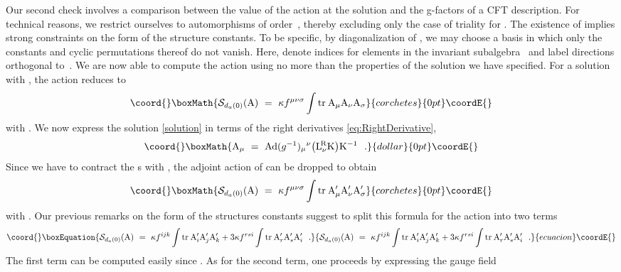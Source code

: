 \documentclass[12pt,a4paper]{article}
\providecommand{\tr}{\text{tr}}
\providecommand{\mf}{\mathfrak} %
\def\ig{\mf{g}^\omega} %
\def\tT{{\rm T}} %
\def\tR{{\rm R}} %
\def\tK{{\rm K}} %
\def\cS{{\mathcal S}}
\def\tF{{\rm F}}
\def\tA{{\rm A}}
\def\tL{{\rm L}}
\def\Ad{{\rm Ad}}
\begin{document}
Our second check involves a comparison between the value of the action 
at the solution and the g-factors of a CFT description. For technical 
reasons, we restrict ourselves to automorphisms \myHighlight{$\omega$}\coordHE{} of order~\coordHE{}, 
thereby excluding only the case of triality for \coordHE{}. The existence of
\myHighlight{$\omega$}\coordHE{} 
implies strong constraints on the form of the structure constants. To 
be specific, by diagonalization of \myHighlight{$\omega$}\coordHE{}, we may choose a basis 
in which only the constants \coordHE{} and cyclic permutations 
thereof do not vanish. Here, \coordHE{} denote indices for elements 
in the invariant subalgebra~\myHighlight{$\ig$}\coordHE{} and \coordHE{} label directions 
orthogonal to~\myHighlight{$\ig$}\coordHE{}. We are now able to compute 
the action using no more than the properties of the solution we have 
specified. For a solution with \myHighlight{$\tF =0$}\coordHE{}, the action reduces to
\[\coord{}\boxMath{
\cS_{d_a(0)}(\tA) \ = \ \kappa f^{\mu \nu \sigma }\int\tr\:\tA_\mu
\tA_\nu \tA_\sigma 
}{corchetes}{0pt}\coordE{}\]
with \coordHE{}. We now express the solution 
\eqref{solution} in terms of the right derivatives
\eqref{eq:RightDerivative}, 
$$\coord{}\boxMath{
  \tA_{\mu }\ =\ \Ad
   (g^{-1}){_{\mu }}^{\nu }\bigl(\tL^{\!\tR }_{\nu }
 \tK\bigr)\tK^{-1}\ \ . 
}{dollar}{0pt}\coordE{}$$
Since we have to contract the \myHighlight{$\tA_\mu$}\coordHE{}s with \coordHE{}, 
the adjoint action of \coordHE{} can be dropped to obtain 
\[\coord{}\boxMath{
\cS_{d_a(0)}(\tA) \ = \ \kappa f^{\mu \nu \sigma }\int\tr\:\tA'_\mu
\tA'_\nu \tA'_\sigma
}{corchetes}{0pt}\coordE{}\]
with \myHighlight{$\tA '_{\mu }=\tK^{-1}(\tL ^{\!\tR }_{\mu }\tK)$}\coordHE{}. Our previous
remarks on the form of the structures constants suggest to split this
formula for the action into two terms 
\begin{equation}\coord{}\boxEquation{
  \label{eq:AuxAction}
  \cS_{d_a(0)}(\tA) \ = \ \kappa f^{ijk}\int\tr\:\tA'_i\tA'_j\tA'_k
   +3 \kappa f^{rsi}\int\tr\:\tA'_r\tA'_s\tA'_i\ \ .
}{
  \cS_{d_a(0)}(\tA) \ = \ \kappa f^{ijk}\int\tr\:\tA'_i\tA'_j\tA'_k
   +3 \kappa f^{rsi}\int\tr\:\tA'_r\tA'_s\tA'_i\ \ .
}{ecuacion}\coordE{}\end{equation}
The first term can be computed 
easily since \myHighlight{$\tA'_{i}(g)=\tR_a(\tT_i)$}\coordHE{}. 
As for the second term, one proceeds by expressing the gauge field
\end{document}
